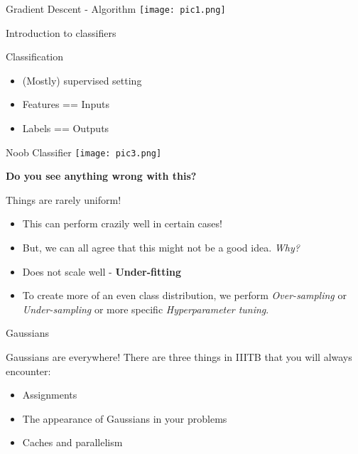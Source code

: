 \documentclass{beamer}
\begin{document}
\begin{frame}{Gradient Descent - Algorithm}
\texttt{[image: pic1.png]}
\end{frame}

\begin{frame}{}
    Introduction to classifiers
\end{frame}



\begin{frame}{Classification}
\begin{itemize}
    \item (Mostly) supervised setting
    \item Features == Inputs
    \item Labels == Outputs
\end{itemize}
\end{frame}


\begin{frame}{Noob Classifier}
    \texttt{[image: pic3.png]}

    \textbf{Do you see anything wrong with this?}

\end{frame}

\begin{frame}{Things are rarely uniform!}
    \begin{itemize}
        \item This can perform crazily well in certain cases! 
        \item But, we can all agree that this might not be a good idea. \textit{Why?}
        \item Does not scale well - \textbf{Under-fitting}
        \item To create more of an even class distribution, we perform \textit{Over-sampling} or \textit{Under-sampling} or more specific \textit{Hyperparameter tuning}.
    \end{itemize}
\end{frame}

\begin{frame}
    Gaussians
\end{frame}

\begin{frame}{Gaussians are everywhere!}
    There are three things in IIITB that you will always encounter:
    \begin{itemize}
        \item Assignments
        \item The appearance of Gaussians in your problems
        \item Caches and parallelism
    \end{itemize}
\end{frame}
\end{document}

